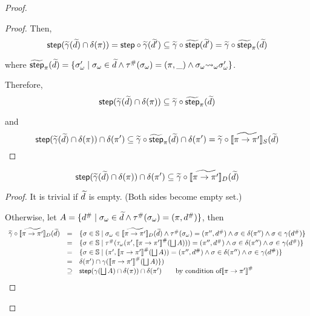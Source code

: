 \begin{proof}
\begin{proof}
Then,
\[
  \textsf{step} (\widetilde{\gamma} (\widetilde{d}) \cap \delta(\pi)) =
  \textsf{step} \circ \widetilde{\gamma} (\widetilde{d}') \subseteq
  \widetilde{\gamma} \circ \widetilde{\textsf{step}}(\widetilde{d}') =
  \widetilde{\gamma} \circ \widetilde{\textsf{step}}_\pi(\widetilde{d})
\]

where $\widetilde{\textsf{step}}_\pi(\widetilde{d}) = \{
      {\sigma}_\omega' \mid {\sigma}_\omega \in \widetilde{d} \wedge
      {\tau}^{\#}({\sigma}_\omega) = (\pi, \_) \wedge
      {\sigma}_\omega {\leadsto}_\omega {\sigma}_\omega'
    \}$.

\bigskip

Therefore,
\[
  \textsf{step} (\widetilde{\gamma} (\widetilde{d}) \cap \delta(\pi)) \subseteq
  \widetilde{\gamma} \circ \widetilde{\textsf{step}}_\pi(\widetilde{d})
\]

and
\[
  \textsf{step} (\widetilde{\gamma} (\widetilde{d}) \cap \delta(\pi)) \cap \delta(\pi') \subseteq
  \widetilde{\gamma} \circ \widetilde{\textsf{step}}_\pi(\widetilde{d}) \cap \delta(\pi') =
  \widetilde{\gamma} \circ [\![{\widetilde{\pi \rightarrow \pi'}}]\!]_S(\widetilde{d})
\]
\end{proof}

\begin{lemma}
\[
  \textsf{step}(\widetilde{\gamma}(\widetilde{d}) \cap \delta(\pi))
  \cap \delta(\pi') \subseteq \widetilde{\gamma} \circ
  [\![{\widetilde{\pi \rightarrow \pi'}}]\!]_D(\widetilde{d})
\]
\end{lemma}

\begin{proof}
It is trivial if $\widetilde{d}$ is empty. (Both sides become empty set.)

Otherwise,
let $A = \{ {d}^{\#} \mid {\sigma}_\omega \in \widetilde{d} \wedge {\tau}^{\#}({\sigma}_\omega) = (\pi, {d}^{\#}) \}$,
then
\[
  \begin{array}{rcl}
    \combgamma \circ \combviewtrans{\view}{\view'}_D(\combelem)
    &=& \{
        \st \in \stset \mid
        \symbst \in \combviewtrans{\view}{\view'}_D(\combelem) \wedge
        \saconverter(\symbst) = (\view'', \abselem) \wedge
        \st \in \delta(\view'') \wedge
        \st \in \gamma(\abselem)
        \}\\
    &=& \{
        \st \in \stset \mid
        \saconverter( \asconverter(\view', \viewtrans{\view}{\view'}(\bigjoin A))) = (\view'', \abselem) \wedge
        \st \in \delta(\view'') \wedge
        \st \in \gamma(\abselem)
        \}\\
    &=& \{
        \st \in \stset \mid
        (\view', \viewtrans{\view}{\view'}(\bigjoin A)) = (\view'', \abselem) \wedge
        \st \in \delta(\view'') \wedge
        \st \in \gamma(\abselem)
        \}\\
    &=& \viewmap(\view') \cap \gamma(\viewtrans{\view}{\view'}(\bigjoin A) \})\\
    &\supseteq& \step(\gamma(\bigjoin A )
      \cap \viewmap(\view)) \cap \viewmap(\view') \qquad \text{by condition of} \viewtrans{\view}{\view'} \\
 \end{array}
\]


\end{proof}
\end{proof}
